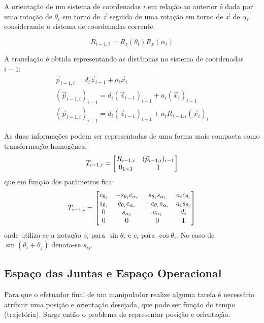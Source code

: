 A orientação de um sistema de coordenadas $i$ em relação ao anterior é dada por uma rotação de $\theta_i$ em torno de $\vec{z}$ seguida de uma rotação em torno de $\vec{x}$ de $\alpha_i$ considerando o sistema de coordenadas corrente.

\begin{equation}
{R}_{i-1,i} = {R}_z(\theta_i){R}_x(\alpha_i)
\end{equation}

A translação é obtida representando as distâncias no sistema de coordenadas $i-1$:
\begin{gather}
{\vec{p}}_{i-1,i} = d_i {\vec{z}}_{i-1} + a_i {\vec{x}}_i \\
({\vec{p}}_{i-1,i})_{i-1} = d_i ({\vec{z}}_{i-1})_{i-1} + a_i ({\vec{x}}_i)_{i-1} \\
({\vec{p}}_{i-1,i})_{i-1} = d_i ({\vec{z}}_{i-1})_{i-1} + a_i {R}_{i-1,i}({\vec{x}}_i)_{i} 
\end{gather}

As duas informações podem ser representadas de uma forma mais compacta como transformação homogênea:
\begin{equation}
T_{i-1,i} = \begin{bmatrix}
    R_{i-1,i}       &  ({\vec{p}}_{i-1,i})_{i-1} \\
    0_{1 \times 3}  &                             1
\end{bmatrix}
\end{equation}
que em função dos parâmetros fica:
\begin{equation} \label{eq:transform_dh}
T_{i-1,i} = \begin{bmatrix}
    c_{\theta_i}  & -s_{\theta_i}c_{\alpha_i}   &   s_{\theta_i}s_{\alpha_i}  & a_i c_{\theta_i} \\ 
    s_{\theta_i}  & c_{\theta_i}c_{\alpha_i}    &  -c_{\theta_i}s_{\alpha_i}  & a_i s_{\theta_i} \\
    0             & s_{\alpha_i}                &   c_{\alpha_i}              & d_i              \\
    0             & 0                           &   0                         & 1
\end{bmatrix}
\end{equation}
onde utiliza-se a notação $s_i$ para $\sin \theta_i$ e $c_i$ para $\cos \theta_i$. No caso de  $\sin (\theta_i + \theta_j)$ denota-se $s_{ij}$.

\subsection{Espaço das Juntas e Espaço Operacional}
Para que o efetuador final de um manipulador realize alguma tarefa é necessário atribuir uma posição e orientação desejada, que  pode ser função do tempo (trajetória). Surge então o problema de representar posição e orientação. 

